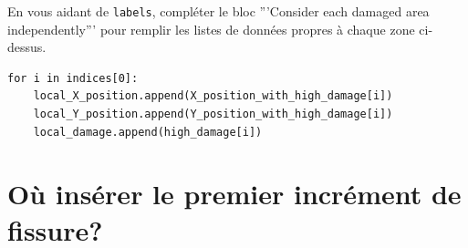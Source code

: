 \documentclass[french,12pt]{exam}
\begin{document}
\begin{questions}
\question En vous aidant de \texttt{labels}, compléter le bloc '''Consider each damaged area independently''' pour remplir les listes de données propres à chaque zone ci-dessus.

\begin{solution}
\begin{lstlisting}
for i in indices[0]:
    local_X_position.append(X_position_with_high_damage[i])
    local_Y_position.append(Y_position_with_high_damage[i])
    local_damage.append(high_damage[i])
\end{lstlisting}  
\end{solution} 
\end{questions}

\section{Où insérer le premier incrément de fissure?}
\end{document}
